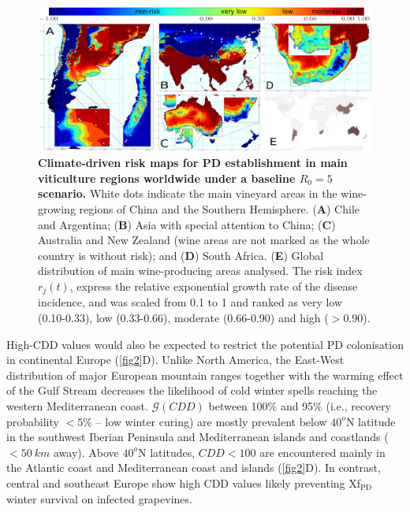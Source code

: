     \begin{figure}[t!]
        \centering
        \includegraphics[width=1\textwidth]{Figures/Fig_global_risk_R0_5.pdf}
        \caption{\textbf{Climate-driven risk maps for PD establishment in main
                viticulture regions worldwide under a baseline $R_0 = 5$
                scenario.} White dots
            indicate the main vineyard areas in the wine-growing regions of
            China and the
            Southern Hemisphere. (\textbf{A}) Chile and Argentina; (\textbf{B})
            Asia with
            special attention to China; (\textbf{C}) Australia and New Zealand
            (wine areas
            are not marked as the whole country is without risk); and
            (\textbf{D}) South
            Africa. (\textbf{E}) Global distribution of main wine-producing
            areas analysed.
            The risk index $r_j(t)$, express the relative exponential growth
            rate of the
            disease incidence, and was scaled from 0.1 to 1 and ranked as very
            low
            (0.10-0.33), low (0.33-0.66), moderate (0.66-0.90) and high ($>
                0.90$).}
        \label{fig3}
    \end{figure}

    High-CDD values would also be expected to restrict the potential PD
    colonisation in continental Europe (\cref{fig2}D). Unlike North America,
    the
    East-West distribution of major European mountain ranges together with the
    warming effect of the Gulf Stream decreases the likelihood of cold winter
    spells reaching the western Mediterranean coast. $\mathcal{G}(CDD)$ between
    100\% and 95\% (i.e., recovery probability $<5\%$ -- low winter curing) are
    mostly prevalent below $40^o$N latitude in the southwest Iberian Peninsula
    and
    Mediterranean islands and coastlands ($<\SI{50}{km}$ away). Above $40^o$N
    latitudes, $CDD < 100$ are encountered mainly in the Atlantic coast and
    Mediterranean coast and islands (\cref{fig2}D). In contrast, central and
    southeast Europe show high CDD values likely preventing Xf$_{\textrm{PD}}$
    winter survival on infected grapevines.

